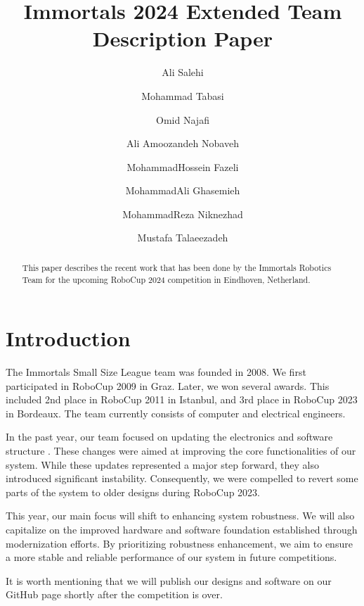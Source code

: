 \documentclass[runningheads]{llncs}
\begin{document}
%
\title{Immortals 2024 Extended Team Description Paper}

\author{Ali Salehi \and
Mohammad Tabasi \and
Omid Najafi \and
Ali Amoozandeh Nobaveh \and
MohammadHossein Fazeli \and
MohammadAli Ghasemieh \and
MohammadReza Niknezhad \and
Mustafa Talaeezadeh}
%
%
%
\maketitle              %
%
\begin{abstract}
This paper describes the recent work that has been done by the Immortals Robotics Team for the upcoming RoboCup 2024 competition in Eindhoven, Netherland.

\end{abstract}

\section{Introduction}
The Immortals Small Size League team was founded in 2008. We first participated in RoboCup 2009 in Graz. Later, we won several awards. This included 2nd place in RoboCup 2011 in Istanbul, and 3rd place in RoboCup 2023 in Bordeaux. The team currently consists of computer and electrical engineers.

In the past year, our team focused on updating the electronics and software structure \cite{ref_ETDP2023}. These changes were aimed at improving the core functionalities of our system. While these updates represented a major step forward, they also introduced significant instability. Consequently, we were compelled to revert some parts of the system to older designs during RoboCup 2023.

This year, our main focus will shift to enhancing system robustness. We will also capitalize on the improved hardware and software foundation established through modernization efforts. By prioritizing robustness enhancement, we aim to ensure a more stable and reliable performance of our system in future competitions.
 
It is worth mentioning that we will publish our designs and software on our GitHub page \cite{ref_github} shortly after the competition is over.
\end{document}
